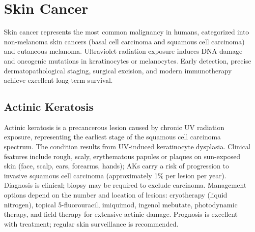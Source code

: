 \section{Skin Cancer}




Skin cancer represents the most common malignancy in humans, categorized into non-melanoma skin cancers (basal cell carcinoma and squamous cell carcinoma) and cutaneous melanoma. Ultraviolet radiation exposure induces DNA damage and oncogenic mutations in keratinocytes or melanocytes. Early detection, precise dermatopathological staging, surgical excision, and modern immunotherapy achieve excellent long-term survival.





\label{sec:Skin Cancer}

\subsection{Actinic Keratosis}
\label{sec:Actinic Keratosis}
Actinic keratosis is a precancerous lesion caused by chronic UV radiation exposure, representing the earliest stage of the squamous cell carcinoma spectrum. The condition results from UV-induced keratinocyte dysplasia. Clinical features include rough, scaly, erythematous papules or plaques on sun-exposed skin (face, scalp, ears, forearms, hands); AKs carry a risk of progression to invasive squamous cell carcinoma (approximately 1\% per lesion per year). Diagnosis is clinical; biopsy may be required to exclude carcinoma. Management options depend on the number and location of lesions: cryotherapy (liquid nitrogen), topical 5-fluorouracil, imiquimod, ingenol mebutate, photodynamic therapy, and field therapy for extensive actinic damage. Prognosis is excellent with treatment; regular skin surveillance is recommended.

